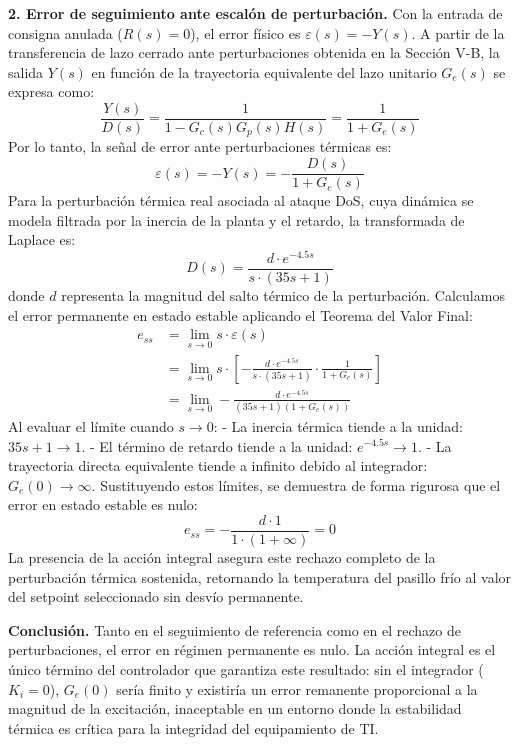 \documentclass[journal,twocolumn]{IEEEtran}
\begin{document}
\textbf{2. Error de seguimiento ante escalón de perturbación.}
Con la entrada de consigna anulada ($R(s) = 0$), el error físico es $\varepsilon(s) = -Y(s)$. A partir de la transferencia de lazo cerrado ante perturbaciones obtenida en la Sección V-B, la salida $Y(s)$ en función de la trayectoria equivalente del lazo unitario $G_e(s)$ se expresa como:
\begin{equation}
    \frac{Y(s)}{D(s)} = \frac{1}{1 - G_c(s)G_p(s)H(s)} = \frac{1}{1 + G_e(s)}
\end{equation}
Por lo tanto, la señal de error ante perturbaciones térmicas es:
\begin{equation}
    \varepsilon(s) = -Y(s) = -\frac{D(s)}{1 + G_e(s)}
\end{equation}
Para la perturbación térmica real asociada al ataque DoS, cuya dinámica se modela filtrada por la inercia de la planta y el retardo, la transformada de Laplace es:
\begin{equation}
    D(s) = \frac{d \cdot e^{-4.5 s}}{s \cdot (35 s + 1)}
\end{equation}
donde $d$ representa la magnitud del salto térmico de la perturbación. Calculamos el error permanente en estado estable aplicando el Teorema del Valor Final:
\begin{align}
    e_{ss} &= \lim_{s \to 0} s \cdot \varepsilon(s) \nonumber \\
           &= \lim_{s \to 0} s \cdot \left[ - \frac{d \cdot e^{-4.5 s}}{s \cdot (35 s + 1)} \cdot \frac{1}{1 + G_e(s)} \right] \nonumber \\
           &= \lim_{s \to 0} - \frac{d \cdot e^{-4.5 s}}{(35 s + 1)(1 + G_e(s))}
\end{align}
Al evaluar el límite cuando $s \to 0$:
- La inercia térmica tiende a la unidad: $35 s + 1 \to 1$.
- El término de retardo tiende a la unidad: $e^{-4.5 s} \to 1$.
- La trayectoria directa equivalente tiende a infinito debido al integrador: $G_e(0) \to \infty$.
Sustituyendo estos límites, se demuestra de forma rigurosa que el error en estado estable es nulo:
\begin{equation}
    e_{ss} = -\frac{d \cdot 1}{1 \cdot (1 + \infty)} = 0
\end{equation}
La presencia de la acción integral asegura este rechazo completo de la perturbación térmica sostenida, retornando la temperatura del pasillo frío al valor del setpoint seleccionado sin desvío permanente.

\textbf{Conclusión.} Tanto en el seguimiento de referencia como en el rechazo de perturbaciones, el error en régimen permanente es nulo. La acción integral es el único término del controlador que garantiza este resultado: sin el integrador ($K_i = 0$), $G_e(0)$ sería finito y existiría un error remanente proporcional a la magnitud de la excitación, inaceptable en un entorno donde la estabilidad térmica es crítica para la integridad del equipamiento de TI.
\end{document}
